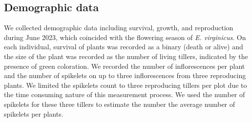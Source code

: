 \documentclass[12pt]{article}\usepackage[]{graphicx}\usepackage[dvipsnames]{xcolor}
\begin{document}

\subsection*{Demographic data}
We collected demographic data including survival, growth, and reproduction during June 2023, which coincided with the flowering season of \emph{E. virginicus}. 
On each individual, survival of plants was recorded as a binary (death or alive) and the size of the plant was recorded as the number of living tillers, indicated by the presence of green coloration. 
We recorded the number of inflorescences per plant and the number of spikelets on up to three inflorescences from three reproducing plants.
We limited the spikelets count to three reproducing tillers per plot due to the time consuming nature of this measurement process. 
We used the number of spikelets for these three tillers to estimate the number the average number of spikelets per plants.
\end{document}
